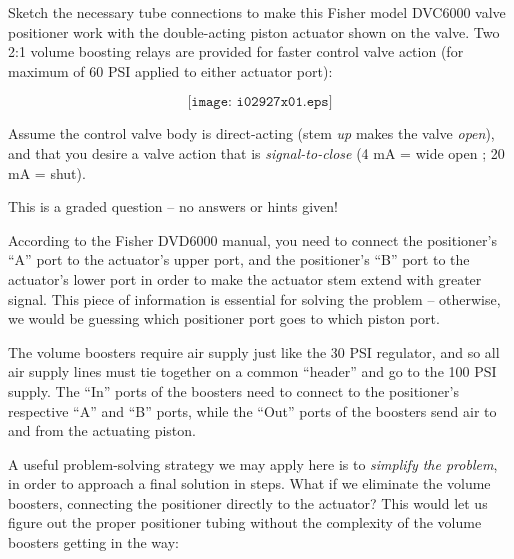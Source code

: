 

Sketch the necessary tube connections to make this Fisher model DVC6000 valve positioner work with the double-acting piston actuator shown on the valve.  Two 2:1 volume boosting relays are provided for faster control valve action (for maximum of 60 PSI applied to either actuator port):

$$\texttt{[image: i02927x01.eps]}$$

Assume the control valve body is direct-acting (stem {\it up} makes the valve {\it open}), and that you desire a valve action that is {\it signal-to-close} (4 mA = wide open ; 20 mA = shut).

\vfil 

\eject






This is a graded question -- no answers or hints given!







According to the Fisher DVD6000 manual, you need to connect the positioner's ``A'' port to the actuator's upper port, and the positioner's ``B'' port to the actuator's lower port in order to make the actuator stem extend with greater signal.  This piece of information is essential for solving the problem -- otherwise, we would be guessing which positioner port goes to which piston port.

The volume boosters require air supply just like the 30 PSI regulator, and so all air supply lines must tie together on a common ``header'' and go to the 100 PSI supply.  The ``In'' ports of the boosters need to connect to the positioner's respective ``A'' and ``B'' ports, while the ``Out'' ports of the boosters send air to and from the actuating piston.

\vskip 10pt

A useful problem-solving strategy we may apply here is to {\it simplify the problem}, in order to approach a final solution in steps.  What if we eliminate the volume boosters, connecting the positioner directly to the actuator?  This would let us figure out the proper positioner tubing without the complexity of the volume boosters getting in the way:

